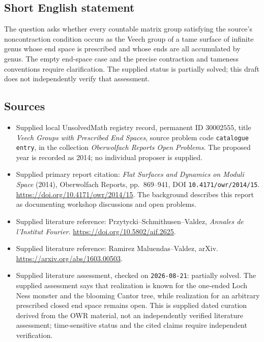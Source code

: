 \documentclass[11pt]{article}
\begin{document}
\subsection{Short English statement}
The question asks whether every countable matrix group satisfying the source's noncontraction condition occurs as the Veech group of a tame surface of infinite genus whose end space is prescribed and whose ends are all accumulated by genus. The empty end-space case and the precise contraction and tameness conventions require clarification. The supplied status is partially solved; this draft does not independently verify that assessment.
\subsection{Sources}
\begin{itemize}
\item Supplied local UnsolvedMath registry record, permanent ID \(30002555\), title \emph{Veech Groups with Prescribed End Spaces}, source problem code \texttt{catalogue entry}, in the collection \emph{Oberwolfach Reports Open Problems}. The proposed year is recorded as 2014; no individual proposer is supplied.
\item Supplied primary report citation: \emph{Flat Surfaces and Dynamics on Moduli Space} (2014), Oberwolfach Reports, pp.\ 869--941, DOI \texttt{10.4171/owr/2014/15}. \url{https://doi.org/10.4171/owr/2014/15}. The background describes this report as documenting workshop discussions and open problems.
\item Supplied literature reference: Przytycki--Schmithusen--Valdez, \emph{Annales de l'Institut Fourier}. \url{https://doi.org/10.5802/aif.2625}.
\item Supplied literature reference: Ramirez Maluendas--Valdez, arXiv. \url{https://arxiv.org/abs/1603.00503}.
\item Supplied literature assessment, checked on \texttt{2026-08-21}: partially solved. The supplied assessment says that realization is known for the one-ended Loch Ness monster and the blooming Cantor tree, while realization for an arbitrary prescribed closed end space remains open. This is supplied dated curation derived from the OWR material, not an independently verified literature assessment; time-sensitive status and the cited claims require independent verification.
\end{itemize}
\end{document}

